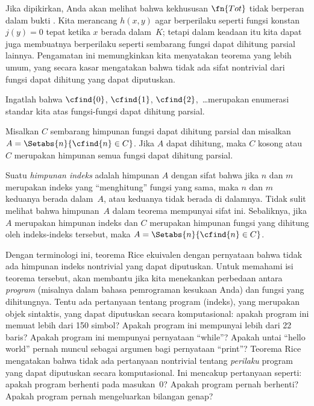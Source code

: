 \documentclass[../../../include/open-logic-section]{subfiles}
\begin{document}

Jika dipikirkan, Anda akan melihat bahwa kekhususan $\fn{Tot}$ tidak berperan
dalam bukti . Kita merancang $h(x,y)$ agar berperilaku
seperti fungsi konstan $j(y)=0$ tepat ketika $x$ berada dalam~$K$; tetapi dalam
keadaan itu kita dapat juga membuatnya berperilaku seperti sembarang fungsi
dapat dihitung parsial lainnya. Pengamatan ini memungkinkan kita menyatakan
teorema yang lebih umum, yang secara kasar mengatakan bahwa tidak ada sifat
nontrivial dari fungsi dapat dihitung yang dapat diputuskan.

Ingatlah bahwa $\cfind{0}$, $\cfind{1}$, $\cfind{2}$,~\dots merupakan
enumerasi standar kita atas fungsi-fungsi dapat dihitung parsial.

\begin{thm}
  Misalkan $C$ sembarang himpunan fungsi dapat dihitung parsial dan misalkan
  $A = \Setabs{n}{\cfind{n} \in C}$. Jika $A$ dapat dihitung, maka $C$ kosong
  atau $C$ merupakan himpunan semua fungsi dapat dihitung parsial.
\end{thm}

Suatu \emph{himpunan indeks} adalah himpunan $A$ dengan sifat bahwa jika $n$
dan $m$ merupakan indeks yang ``menghitung'' fungsi yang sama, maka $n$ dan
$m$ keduanya berada dalam~$A$, atau keduanya tidak berada di dalamnya. Tidak
sulit melihat bahwa himpunan~$A$ dalam teorema mempunyai sifat ini. Sebaliknya,
jika $A$ merupakan himpunan indeks dan $C$ merupakan himpunan fungsi yang
dihitung oleh indeks-indeks tersebut, maka
$A = \Setabs{n}{\cfind{n} \in C}$.

\begin{explain}
Dengan terminologi ini, teorema Rice ekuivalen dengan pernyataan bahwa tidak
ada himpunan indeks nontrivial yang dapat diputuskan. Untuk memahami isi
teorema tersebut, akan membantu jika kita menekankan perbedaan antara
\emph{program} (misalnya dalam bahasa pemrograman kesukaan Anda) dan fungsi
yang dihitungnya. Tentu ada pertanyaan tentang program (indeks), yang
merupakan objek sintaktis, yang dapat diputuskan secara komputasional: apakah
program ini memuat lebih dari 150 simbol? Apakah program ini mempunyai lebih
dari 22 baris? Apakah program ini mempunyai pernyataan ``while''? Apakah
untai ``hello world'' pernah muncul sebagai argumen bagi pernyataan
``print''? Teorema Rice mengatakan bahwa tidak ada pertanyaan nontrivial
tentang \emph{perilaku} program yang dapat diputuskan secara komputasional.
Ini mencakup pertanyaan seperti: apakah program berhenti pada masukan~$0$?
Apakah program pernah berhenti? Apakah program pernah mengeluarkan bilangan
genap?
\end{explain}
\end{document}
